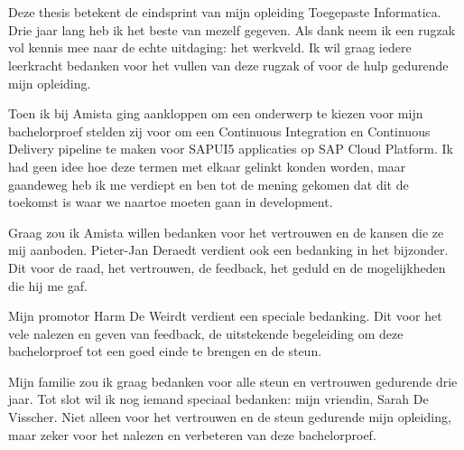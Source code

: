 
\chapter*{}
\label{ch:voorwoord}


Deze thesis betekent de eindsprint van mijn opleiding Toegepaste Informatica. Drie jaar lang heb ik het beste van mezelf gegeven. Als dank neem ik een rugzak vol kennis mee naar de echte uitdaging: het werkveld.
Ik wil graag iedere leerkracht bedanken voor het vullen van deze rugzak of voor de hulp gedurende mijn opleiding.

Toen ik bij Amista ging aankloppen om een onderwerp te kiezen voor mijn bachelorproef stelden zij voor om een Continuous Integration en Continuous Delivery pipeline te maken voor SAPUI5 applicaties op SAP Cloud Platform. Ik had geen idee hoe deze termen met elkaar gelinkt konden worden, maar gaandeweg heb ik me verdiept en ben tot de mening gekomen dat dit de toekomst is waar we naartoe moeten gaan in development.

Graag zou ik Amista willen bedanken voor het vertrouwen en de kansen die ze mij aanboden.
Pieter-Jan Deraedt verdient ook een bedanking in het bijzonder. Dit voor de raad, het vertrouwen, de feedback, het geduld en de mogelijkheden die hij me gaf.

Mijn promotor Harm De Weirdt verdient een speciale bedanking. Dit voor het vele nalezen en geven van feedback, de uitstekende begeleiding om deze bachelorproef tot een goed einde te brengen en de steun.

Mijn familie zou ik graag bedanken voor alle steun en vertrouwen gedurende drie jaar.
Tot slot wil ik nog iemand speciaal bedanken: mijn vriendin, Sarah De Visscher. Niet alleen voor het vertrouwen en de steun gedurende mijn opleiding, maar zeker voor het nalezen en verbeteren van deze bachelorproef.

